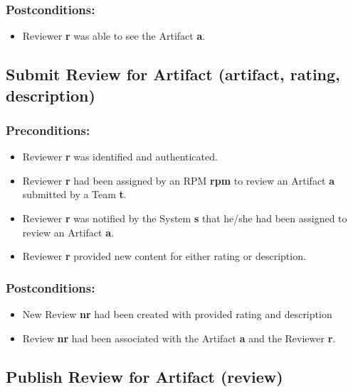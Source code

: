 \subsubsection*{Postconditions:}
\begin{itemize}
\itemsep-1em 
    \item Reviewer \textbf{r} was able to see the Artifact \textbf{a}.
\end{itemize}



\subsection*{Submit Review for Artifact (artifact, rating, description) }
\subsubsection*{Preconditions:}
\begin{itemize}
\itemsep-1em 
    \item Reviewer \textbf{r} was identified and authenticated. 
    \item Reviewer \textbf{r} had been assigned by an RPM \textbf{rpm} to review an Artifact \textbf{a} submitted by a Team \textbf{t}.
    \item Reviewer \textbf{r} was notified by the System \textbf{s} that he/she had been assigned to review an Artifact \textbf{a}.
    \item Reviewer \textbf{r} provided new content for either rating or description.
\end{itemize}



\subsubsection*{Postconditions:}
\begin{itemize}
\itemsep-1em 
    \item New Review \textbf{nr} had been created with provided rating and description
    \item Review \textbf{nr} had been associated with the Artifact \textbf{a} and the Reviewer \textbf{r}.
\end{itemize}




\subsection*{Publish Review for Artifact (review)}
